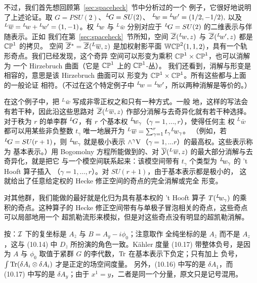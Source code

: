 不过，我们首先想回顾第~\ref{sec:spaceheck}~节中分析过的一个
例子，它很好地说明了上述论证。取 $G=PSU(2)$、$\LG=SU(2)$、
$^L\negthinspace w={}^L\negthinspace
w'=(1/2,-1/2),$ 以及 $^L\bar w={}^L\negthinspace
w+{}^L\negthinspace w'=(1,-1)$。权 $^L\negthinspace w$ 与
$^L\bar w$ 分别对应于 $\LG=SU(2)$ 的二维表示与伴随表示。正如
我们在第~\ref{sec:spaceheck}~节所知，空间
$\bar {{\EUZ}}(^L\negthinspace w,z)$ 与
$\bar {{\EUZ}}(^L\negthinspace w',z)$ 都是 $\Bbb{CP}^1$ 的拷贝。
空间 $\bar\EUZ{}^*=\bar {{\EUZ}}(^L\bar w,z)$ 是加权射影平面
$\Bbb{WCP}^2(1,1,2)$，具有一个轨形奇点。我们已经发现，这个奇异
空间可以形变为乘积 $\Bbb{CP}^1\times\Bbb{CP}^1$，也可以消解为
一个 Hirzebruch 曲面（它是 $\Bbb{CP}^1$ 上的 $\Bbb{CP}^1$-丛）。
我们还看到，消解与形变是相容的，意思是该 Hirzebruch 曲面可以
形变为 $\Bbb{CP}^1\times\Bbb{CP}^1$。所有这些都与上面的一般论证
相符。（不过在这个特定例子中 $^L\negthinspace w={}^L\negthinspace
w'$，所以两种消解是等价的。）

在这个例子中，把 $^L\bar w$ 写成非零正权之和只有一种方式。一般
地，这样的写法会有若干种，因此沿这些思路对
$\bar {{\EUZ}}(^L\bar w,z)$ 作部分消解与去奇异化就有若干种选择。
对于秩为 $r$ 的单李群 $^L\negthinspace G$，有 $r$ 个基本权
$^L\negthinspace w_\gamma$（$\gamma=1,\dots,r$），使得任何主
权 $^L\bar w$ 都可以用某些非负整数 $t_\gamma$ 唯一地展开为
$^L\bar w=\sum_{\gamma=1}^r t_\gamma {}^L\negthinspace w_\gamma$。
（例如，若 $^L\negthinspace G=SU(r+1)$，则
$^L\negthinspace w_\gamma$ 就是极小表示
$\wedge^\gamma \VV$（$\gamma=1,\dots r$）的最高权。这些表示称为
基本表示。）用 Bogomolny 方程所能做到的、对
$\bar {{\EUY}}(^L\bar w,z)$ 的最大部分消解与去奇异化，就是把它
与一个模空间联系起来：该模空间带有 $t_\gamma$ 个类型为
$^L\negthinspace w_\gamma$ 的 't Hooft 算子插入
（$\gamma=1,\dots,r$）。对 $SU(r+1)$，由于基本表示都是极小的，
这就给出了任意给定权的 Hecke 修正空间的奇点的完全消解或完全
形变。

对其他群，我们能做的最好就是化归为具有基本权的 't Hooft 算子
$T({}^L\negthinspace w_\gamma)$ 的乘积的奇点。这种算子的 Hecke
修正空间带有与单极子冒泡相关的奇点，这些奇点可以局部地用一个
超凯勒流形来模拟，但是对这些奇点没有明显的超凯勒消解。

\begin{yizhu}[易错点]
按：${\cal I}$ 下的复坐标是 $A_{\bar z}$ 与 $B=A_y-i\phi_0$；注意取作
全纯坐标的是 $A_{\bar z}$ 而不是 $A_z$，这与 (10.14) 中 $D_{\bar z}$
所扮演的角色一致。Kähler 度量 (10.17) 带整体负号，是因为 $A$ 与
$\phi_0$ 取值于紧群 $G$ 的李代数，$\Tr$ 在基本表示下负定；只有加上
负号，$\int\Tr(\delta A_i\otimes\delta A_i)$ 才是正定的场空间度量。
另外，(10.16) 中写的是 $\delta A_1$，而 (10.17) 中写的是
$\delta A_y$；由于 $x^1=y$，二者是同一个分量，原文只是记号混用。
\end{yizhu}

